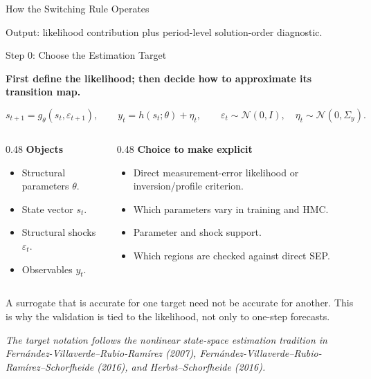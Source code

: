 \documentclass[aspectratio=169,10pt]{beamer}
\newcommand{\eps}{\varepsilon}
\newcommand{\state}{s}
\newcommand{\obs}{y}
\newcommand{\smallnote}[1]{%
  \vspace{0.25em}
  \begin{center}
  \parbox{0.92\linewidth}{\centering\footnotesize #1}
  \end{center}
}
\newcommand{\sourcefoot}[1]{%
  \vspace{-0.55em}
  \begin{flushleft}
  \parbox{0.96\linewidth}{\raggedright\tiny\textit{#1}}
  \end{flushleft}
}
\newcommand{\claim}[1]{%
  \begin{center}
  \parbox{0.94\linewidth}{\centering\large\bfseries #1}
  \end{center}
}
\begin{document}
\begin{frame}{How the Switching Rule Operates}
\vspace{-0.2em}
\begin{center}
\scriptsize Output: likelihood contribution plus period-level solution-order diagnostic.
\end{center}
\end{frame}

\begin{frame}{Step 0: Choose the Estimation Target}
\claim{First define the likelihood; then decide how to approximate its transition map.}

\vspace{0.25em}
\[
  \state_{t+1}=g_\theta(\state_t,\eps_{t+1}),\qquad
  \obs_t=h(\state_t;\theta)+\eta_t,\qquad
  \eps_t\sim\mathcal N(0,I),\quad
  \eta_t\sim\mathcal N(0,\Sigma_y).
\]

\vspace{-0.15em}
\begin{columns}[T,onlytextwidth]
\begin{column}{0.48\textwidth}
\textbf{Objects}
\begin{itemize}
  \item Structural parameters \(\theta\).
  \item State vector \(\state_t\).
  \item Structural shocks \(\eps_t\).
  \item Observables \(\obs_t\).
\end{itemize}
\end{column}
\begin{column}{0.48\textwidth}
\textbf{Choice to make explicit}
\begin{itemize}
  \item Direct measurement-error likelihood or inversion/profile criterion.
  \item Which parameters vary in training and HMC.
  \item Parameter and shock support.
  \item Which regions are checked against direct SEP.
\end{itemize}
\end{column}
\end{columns}

\smallnote{A surrogate that is accurate for one target need not be accurate for another. This is why the validation is tied to the likelihood, not only to one-step forecasts.}
\sourcefoot{The target notation follows the nonlinear state-space estimation tradition in Fern\'andez-Villaverde--Rubio-Ram\'irez (2007), Fern\'andez-Villaverde--Rubio-Ram\'irez--Schorfheide (2016), and Herbst--Schorfheide (2016).}
\end{frame}
\end{document}
